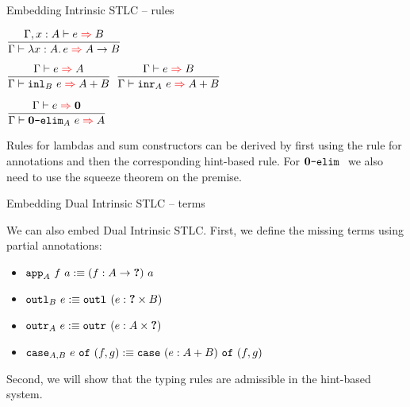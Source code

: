 \documentclass{beamer}
\begin{document}
\begin{frame}{Embedding Intrinsic STLC -- rules}

\begin{center}
  $\infrule{\infer[\extend{\Gamma}{x}{A}]{e}{B}}{\infer{\fun{x}[A]{e}}{\Fun{A}{B}}}$

  \vspace{2em}

  $\infrule{\infer{e}{A}}{\infer{\inl[B]{e}}{\Sum{A}{B}}}$ \quad
  $\infrule{\infer{e}{B}}{\infer{\inr[A]{e}}{\Sum{A}{B}}}$

  \vspace{2em}

  $\infrule{\infer{e}{\Empty}}{\infer{\emptyelim[A]{e}}{A}}$
\end{center}

\vspace{2em}

Rules for lambdas and sum constructors can be derived by first using the rule for annotations and then the corresponding hint-based rule. For $\emptyelim{}$ we also need to use the squeeze theorem on the premise.

\end{frame}

\begin{frame}{Embedding Dual Intrinsic STLC -- terms}

We can also embed Dual Intrinsic STLC. First, we define the missing terms using partial annotations:

\begin{itemize}
  \item $\app[A]{f}{a} :\equiv \app{\annot{f}{\Fun{A}{\Hole}}}{a}$
  \item $\outl[B]{e} :\equiv \outl{\annot{e}{\Prod{\Hole}{B}}}$
  \item $\outr[A]{e} :\equiv \outr{\annot{e}{\Prod{A}{\Hole}}}$
  \item $\caseannot{A}{B}{e}{f}{g} :\equiv \case{\annot{e}{\Sum{A}{B}}}{f}{g}$
\end{itemize}

\vspace{2em}

Second, we will show that the typing rules are admissible in the hint-based system.

\end{frame}
\end{document}
